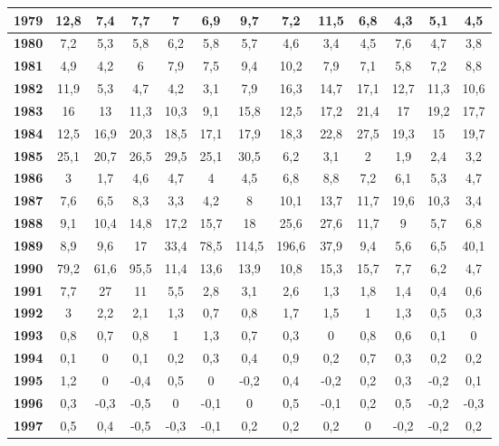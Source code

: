 \begin{center}
\begin{scriptsize}
\begin{longtable}{|c|c|c|c|c|c|c|c|c|c|c|c|c|}
\hline 
\textbf{1979} & 12,8 & 7,4 & 7,7 & 7 & 6,9 & 9,7 & 7,2 & 11,5 & 6,8 & 4,3 & 5,1 & 4,5  \\ 
\hline 
\textbf{1980} & 7,2 & 5,3 & 5,8 & 6,2 & 5,8 & 5,7 & 4,6 & 3,4 & 4,5 & 7,6 & 4,7 & 3,8  \\ 
\hline 
\textbf{1981} & 4,9 & 4,2 & 6 & 7,9 & 7,5 & 9,4 & 10,2 & 7,9 & 7,1 & 5,8 & 7,2 & 8,8  \\ 
\hline 
\textbf{1982} & 11,9 & 5,3 & 4,7 & 4,2 & 3,1 & 7,9 & 16,3 & 14,7 & 17,1 & 12,7 & 11,3 & 10,6  \\ 
\hline 
\textbf{1983} & 16 & 13 & 11,3 & 10,3 & 9,1 & 15,8 & 12,5 & 17,2 & 21,4 & 17 & 19,2 & 17,7  \\ 
\hline 
\textbf{1984} & 12,5 & 16,9 & 20,3 & 18,5 & 17,1 & 17,9 & 18,3 & 22,8 & 27,5 & 19,3 & 15 & 19,7  \\ 
\hline 
\textbf{1985} & 25,1 & 20,7 & 26,5 & 29,5 & 25,1 & 30,5 & 6,2 & 3,1 & 2 & 1,9 & 2,4 & 3,2  \\ 
\hline 
\textbf{1986} & 3 & 1,7 & 4,6 & 4,7 & 4 & 4,5 & 6,8 & 8,8 & 7,2 & 6,1 & 5,3 & 4,7  \\ 
\hline 
\textbf{1987} & 7,6 & 6,5 & 8,3 & 3,3 & 4,2 & 8 & 10,1 & 13,7 & 11,7 & 19,6 & 10,3 & 3,4  \\ 
\hline 
\textbf{1988} & 9,1 & 10,4 & 14,8 & 17,2 & 15,7 & 18 & 25,6 & 27,6 & 11,7 & 9 & 5,7 & 6,8  \\ 
\hline 
\textbf{1989} & 8,9 & 9,6 & 17 & 33,4 & 78,5 & 114,5 & 196,6 & 37,9 & 9,4 & 5,6 & 6,5 & 40,1  \\ 
\hline 
\textbf{1990} & 79,2 & 61,6 & 95,5 & 11,4 & 13,6 & 13,9 & 10,8 & 15,3 & 15,7 & 7,7 & 6,2 & 4,7  \\ 
\hline 
\textbf{1991} & 7,7 & 27 & 11 & 5,5 & 2,8 & 3,1 & 2,6 & 1,3 & 1,8 & 1,4 & 0,4 & 0,6  \\ 
\hline 
\textbf{1992} & 3 & 2,2 & 2,1 & 1,3 & 0,7 & 0,8 & 1,7 & 1,5 & 1 & 1,3 & 0,5 & 0,3  \\ 
\hline 
\textbf{1993} & 0,8 & 0,7 & 0,8 & 1 & 1,3 & 0,7 & 0,3 & 0 & 0,8 & 0,6 & 0,1 & 0  \\ 
\hline 
\textbf{1994} & 0,1 & 0 & 0,1 & 0,2 & 0,3 & 0,4 & 0,9 & 0,2 & 0,7 & 0,3 & 0,2 & 0,2  \\ 
\hline 
\textbf{1995} & 1,2 & 0 & -0,4 & 0,5 & 0 & -0,2 & 0,4 & -0,2 & 0,2 & 0,3 & -0,2 & 0,1  \\ 
\hline 
\textbf{1996} & 0,3 & -0,3 & -0,5 & 0 & -0,1 & 0 & 0,5 & -0,1 & 0,2 & 0,5 & -0,2 & -0,3  \\ 
\hline 
\textbf{1997} & 0,5 & 0,4 & -0,5 & -0,3 & -0,1 & 0,2 & 0,2 & 0,2 & 0 & -0,2 & -0,2 & 0,2  \\ 

\end{longtable}
\end{scriptsize}
\end{center}
